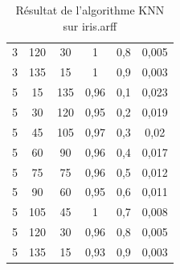 \begin{table}[H]
\begin{tabular}{|c|c|c|c|c|c|}
					3          & 120                                                                            & 30                                                                    & 1                  & 0,8            & 0,005          \\
					3          & 135                                                                            & 15                                                                    & 1                  & 0,9            & 0,003          \\
					5          & 15                                                                             & 135                                                                   & 0,96               & 0,1            & 0,023          \\
					5          & 30                                                                             & 120                                                                   & 0,95               & 0,2            & 0,019          \\
					5          & 45                                                                             & 105                                                                   & 0,97               & 0,3            & 0,02           \\
					5          & 60                                                                             & 90                                                                    & 0,96               & 0,4            & 0,017          \\
					5          & 75                                                                             & 75                                                                    & 0,96               & 0,5            & 0,012          \\
					5          & 90                                                                             & 60                                                                    & 0,95               & 0,6            & 0,011          \\
					5          & 105                                                                            & 45                                                                    & 1                  & 0,7            & 0,008          \\
					5          & 120                                                                            & 30                                                                    & 0,96               & 0,8            & 0,005          \\
					5          & 135                                                                            & 15                                                                    & 0,93               & 0,9            & 0,003          \\ \hline
				\end{tabular}
				\caption{Résultat de l'algorithme KNN sur iris.arff}
				\label{my-label}
			\end{table}
